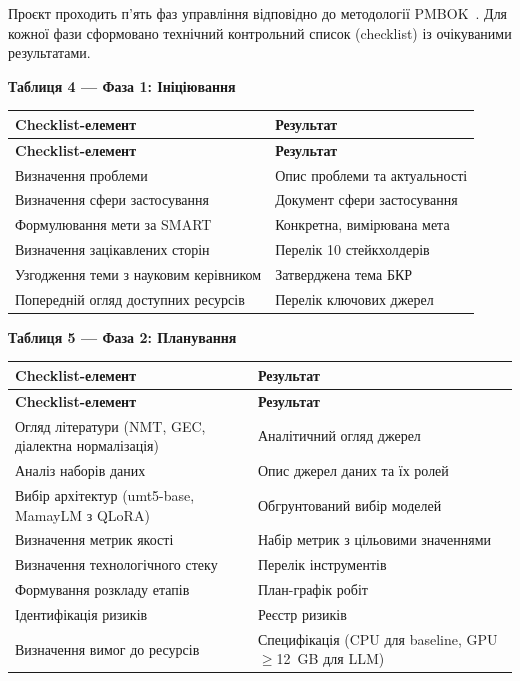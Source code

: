 \documentclass[14pt]{extarticle}
\newcommand{\tabhead}[1]{\textbf{#1}}
\begin{document}
Проєкт проходить п'ять фаз управління відповідно до методології PMBOK~\cite{pmbok}. Для кожної фази сформовано технічний контрольний список (checklist) із очікуваними результатами.

\vspace{4pt}
\noindent\textbf{Таблиця 4 --- Фаза 1: Ініціювання}

\begin{longtable}{|p{}|p{}|}
\hline
\tabhead{Checklist-елемент} & \tabhead{Результат} \\
\hline
\endfirsthead
\hline
\tabhead{Checklist-елемент} & \tabhead{Результат} \\
\hline
\endhead
Визначення проблеми & Опис проблеми та актуальності \\
\hline
Визначення сфери застосування & Документ сфери застосування \\
\hline
Формулювання мети за SMART & Конкретна, вимірювана мета \\
\hline
Визначення зацікавлених сторін & Перелік 10 стейкхолдерів \\
\hline
Узгодження теми з науковим керівником & Затверджена тема БКР \\
\hline
Попередній огляд доступних ресурсів & Перелік ключових джерел \\
\hline
\end{longtable}

\vspace{4pt}
\noindent\textbf{Таблиця 5 --- Фаза 2: Планування}

\begin{longtable}{|p{}|p{}|}
\hline
\tabhead{Checklist-елемент} & \tabhead{Результат} \\
\hline
\endfirsthead
\hline
\tabhead{Checklist-елемент} & \tabhead{Результат} \\
\hline
\endhead
Огляд літератури (NMT, GEC, діалектна нормалізація) & Аналітичний огляд джерел \\
\hline
Аналіз наборів даних & Опис джерел даних та їх ролей \\
\hline
Вибір архітектур (umt5-base, MamayLM з QLoRA) & Обгрунтований вибір моделей \\
\hline
Визначення метрик якості & Набір метрик з цільовими значеннями \\
\hline
Визначення технологічного стеку & Перелік інструментів \\
\hline
Формування розкладу етапів & План-графік робіт \\
\hline
Ідентифікація ризиків & Реєстр ризиків \\
\hline
Визначення вимог до ресурсів & Специфікація (CPU для baseline, GPU $\geq$12~GB для LLM) \\
\hline
\end{longtable}
\end{document}
